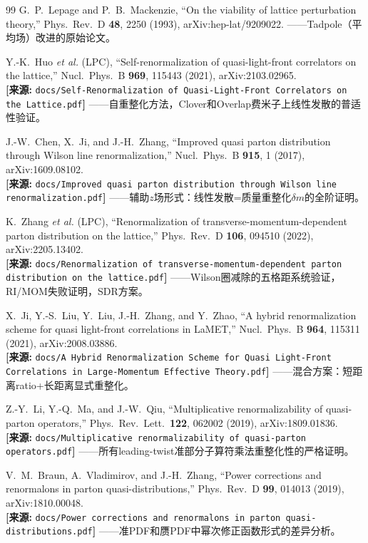 \documentclass[12pt,a4paper]{ctexart}
\theoremstyle{definition}
\begin{document}
\begin{thebibliography}{99}
G.~P.~Lepage and P.~B.~Mackenzie,
``On the viability of lattice perturbation theory,''
Phys.\ Rev.\ D \textbf{48}, 2250 (1993), arXiv:hep-lat/9209022.
——Tadpole（平均场）改进的原始论文。

Y.-K.~Huo \textit{et al.} (LPC),
``Self-renormalization of quasi-light-front correlators on the lattice,''
Nucl.\ Phys.\ B \textbf{969}, 115443 (2021), arXiv:2103.02965.
\\\textbf{[来源:} \texttt{docs/Self-Renormalization of Quasi-Light-Front Correlators on the Lattice.pdf}\textbf{]}
——自重整化方法，Clover和Overlap费米子上线性发散的普适性验证。

J.-W.~Chen, X.~Ji, and J.-H.~Zhang,
``Improved quasi parton distribution through Wilson line renormalization,''
Nucl.\ Phys.\ B \textbf{915}, 1 (2017), arXiv:1609.08102.
\\\textbf{[来源:} \texttt{docs/Improved quasi parton distribution through Wilson line renormalization.pdf}\textbf{]}
——辅助$z$场形式：线性发散=质量重整化$\delta m$的全阶证明。

K.~Zhang \textit{et al.} (LPC),
``Renormalization of transverse-momentum-dependent parton distribution on the lattice,''
Phys.\ Rev.\ D \textbf{106}, 094510 (2022), arXiv:2205.13402.
\\\textbf{[来源:} \texttt{docs/Renormalization of transverse-momentum-dependent parton distribution on the lattice.pdf}\textbf{]}
——Wilson圈减除的五格距系统验证，RI/MOM失败证明，SDR方案。

X.~Ji, Y.-S.~Liu, Y.~Liu, J.-H.~Zhang, and Y.~Zhao,
``A hybrid renormalization scheme for quasi light-front correlations in LaMET,''
Nucl.\ Phys.\ B \textbf{964}, 115311 (2021), arXiv:2008.03886.
\\\textbf{[来源:} \texttt{docs/A Hybrid Renormalization Scheme for Quasi Light-Front Correlations in Large-Momentum Effective Theory.pdf}\textbf{]}
——混合方案：短距离ratio+长距离显式重整化。

Z.-Y.~Li, Y.-Q.~Ma, and J.-W.~Qiu,
``Multiplicative renormalizability of quasi-parton operators,''
Phys.\ Rev.\ Lett.\ \textbf{122}, 062002 (2019), arXiv:1809.01836.
\\\textbf{[来源:} \texttt{docs/Multiplicative renormalizability of quasi-parton operators.pdf}\textbf{]}
——所有leading-twist准部分子算符乘法重整化性的严格证明。

V.~M.~Braun, A.~Vladimirov, and J.-H.~Zhang,
``Power corrections and renormalons in parton quasi-distributions,''
Phys.\ Rev.\ D \textbf{99}, 014013 (2019), arXiv:1810.00048.
\\\textbf{[来源:} \texttt{docs/Power corrections and renormalons in parton quasi-distributions.pdf}\textbf{]}
——准PDF和赝PDF中幂次修正函数形式的差异分析。


\end{thebibliography}
\end{document}
